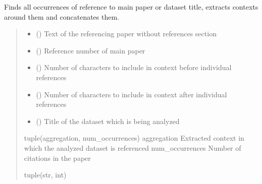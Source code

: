 \documentclass[letterpaper,10pt,english]{sphinxmanual}
\begin{document}
\begin{fulllineitems}
\label{\detokenize{reference_analysis:reference_analysis.get_sections_by_reference_number_or_title}}
\pysigstartsignatures
\pysiglinewithargsret
{}
{\sphinxparamcomma {}\sphinxparamcomma {}\sphinxparamcomma {}\sphinxparamcomma {}}
{}
\pysigstopsignatures
\sphinxAtStartPar
Finds all occurrences of reference to main paper or dataset title, extracts contexts around them and concatenates them.
\begin{quote}\begin{description}
\begin{itemize}
\item {} 
\sphinxAtStartPar
{} () \textendash{} Text of the referencing paper without references section

\item {} 
\sphinxAtStartPar
{} () \textendash{} Reference number of main paper

\item {} 
\sphinxAtStartPar
{} () \textendash{} Number of characters to include in context before individual references

\item {} 
\sphinxAtStartPar
{} () \textendash{} Number of characters to include in context after individual references

\item {} 
\sphinxAtStartPar
{} () \textendash{} Title of the dataset which is being analyzed

\end{itemize}

\sphinxAtStartPar
tuple(aggregation, num\_occurrences)
aggregation \sphinxhyphen{} Extracted context in which the analyzed dataset is referenced
num\_occurrences \sphinxhyphen{} Number of citations in the paper

\sphinxAtStartPar
tuple(str, int)

\end{description}\end{quote}

\end{fulllineitems}
\end{document}

